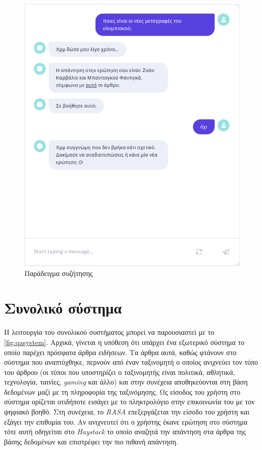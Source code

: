 \begin{figure}[!ht]
\begin{minipage}{0.5\textwidth}
  \includegraphics[width=1\textwidth]{images/chapter4/rasa-x-example-2.png}
\noindent
\caption{Παράδειγμα συζήτησης}
\label{fig:example-2}
\end{minipage}
\end{figure}

\section{Συνολικό σύστημα}
\label{sec:qasystem}
Η λειτουργία του συνολικού συστήματος μπορεί να παρουσιαστεί με το \linebreak \autoref{fig:qasystem}. Αρχικά, γίνεται η υπόθεση ότι υπάρχει ένα εξωτερικό σύστημα το οποίο παρέχει πρόσφατα άρθρα ειδήσεων. Τα άρθρα αυτά, καθώς φτάνουν στο σύστημα που αναπτύχθηκε, περνούν από έναν ταξινομητή ο οποίος ανιχνεύει τον τύπο του άρθρου (οι τύποι που υποστηρίζει ο ταξινομητής είναι πολιτικά, αθλητικά, τεχνολογία, ταινίες, \emph{gaming} και άλλο) και στην συνέχεια αποθηκεύονται στη βάση δεδομένων μαζί με τη πληροφορία της ταξινόμησης. Ως είσοδος του χρήστη στο σύστημα ορίζεται οτιδήποτε εισάγει με το πληκτρολόγιο στην επικοινωνία του με τον ψηφιακό βοηθό. Στη συνέχεια, το \emph{RASA} επεξεργάζεται την είσοδο του χρήστη και εξάγει την επιθυμία του. Αν ανιχνευτεί ότι ο χρήστης έκανε ερώτηση στο σύστημα τότε αυτή οδηγείται στο \emph{Haystack} το οποίο αναζητά την απάντηση στα άρθρα της βάσης δεδομένων και επιστρέφει την πιο πιθανή απάντηση.

